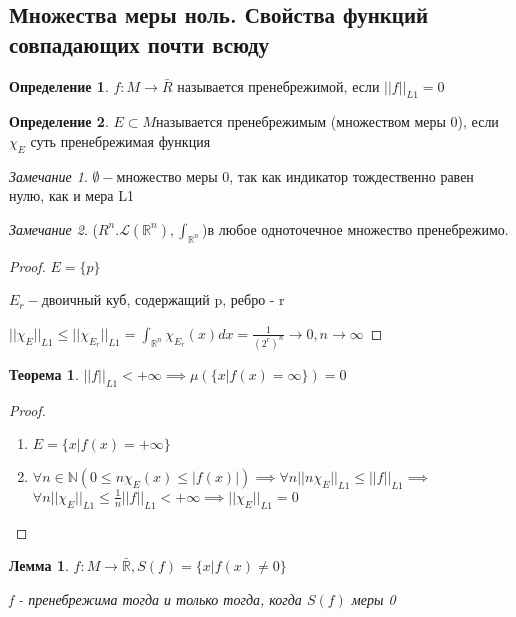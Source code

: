 \documentclass[a4paper]{article}
\newtheorem{theorem}{Теорема}[section]
\newtheorem{lemma}{Лемма}[section]
\theoremstyle{definition}
\newtheorem*{definition}{Определение}
\theoremstyle{remark}
\newtheorem*{remark}{Замечание}
\begin{document}
    \subsection{ Множества меры ноль. Свойства функций совпадающих почти всюду}
    \begin{definition}
     $f: M\to \bar{R}$ называется пренебрежимой, если $||f||_{L1} = 0$
\end{definition}
\begin{definition}
     $E\subset M$называется пренебрежимым (множеством меры 0), если $\chi_E$ суть пренебрежимая функция
\end{definition}
\begin{remark}
     $\emptyset - $множество меры 0, так как индикатор тождественно равен нулю, как и мера L1
\end{remark}
\begin{remark}
     ($R^n. \mathcal{L} (\mathbb{R} ^n), \int_{\mathbb{R} ^n}$)в любое одноточечное множество пренебрежимо. 
\end{remark}
\begin{proof}
     $E = \{p\}$

     $E_r - $двоичный куб, содержащий p, ребро - r

     $||\chi_E||_{L1}\leq ||\chi_{E_r}||_{L1} = \int_{\mathbb{R} ^n}\chi_{E_r}(x)dx = \frac{1}{(2^r)^n}\to 0, n\to \infty$
\end{proof}
\begin{theorem}
     $||f||_{L1}< +\infty\implies \mu(\{x | f(x) = \infty\}) = 0$
\end{theorem}
\begin{proof}
     \begin{enumerate}
          \item $E =\{x|f(x)=+\infty\}$ 
          \item $\forall n \in \mathbb{N} (0\leq n \chi_E(x)\leq |f(x)|)\implies \forall n ||n\chi_E||_{L1} \leq ||f||_{L1}\implies$
          $\forall n ||\chi_E||_{L1}\leq \frac{1}{n}||f||_{L1}< +\infty\implies ||\chi_E||_{L1} = 0$
     \end{enumerate}
\end{proof}
\begin{lemma}
     $f:M\to\bar{\mathbb{R} }, S(f) = \{x | f(x)\neq 0\}$

     f - пренебрежима тогда и только тогда, когда $S(f)$ меры 0
\end{lemma}
\end{document}
